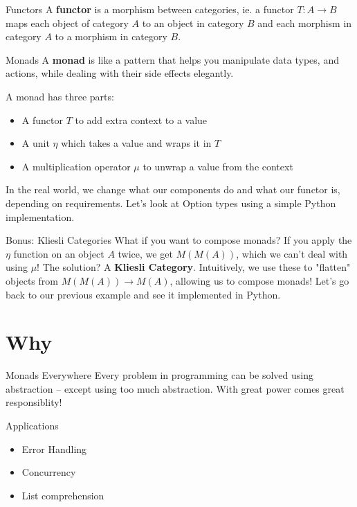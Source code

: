 \documentclass{purdue-slide}
\begin{document}
\begin{frame}{Functors}
    A \textbf{functor} is a morphism between categories, ie. a functor $T: A \rightarrow B$ maps each object of category $A$ to an object in category $B$ and each morphism in category $A$ to a morphism in category $B$. 
\end{frame}

\begin{frame}{Monads}
    A \textbf{monad} is like a pattern that helps you manipulate data types, and actions, while dealing with their side effects elegantly. 

   \par \medskip A monad has three parts: \begin{itemize}
        \item A functor $T$ to add extra context to a value
        \item A unit $\eta$ which takes a value and wraps it in $T$
        \item A multiplication operator $\mu$ to unwrap a value from the context
    \end{itemize}

    \par \medskip In the real world, we change what our components do and what our functor is, depending on requirements. Let's look at Option types using a simple Python implementation.
\end{frame}

\begin{frame}{Bonus: Kliesli Categories}
    What if you want to compose monads? If you apply the $\eta$ function on an object $A$ twice, we get $M(M(A))$, which we can't deal with using $\mu$! The solution? A \textbf{Kliesli Category}. Intuitively, we use these to "flatten" objects from $M(M(A)) \rightarrow M(A)$, allowing us to compose monads! Let's go back to our previous example and see it implemented in Python.
\end{frame}

\section{Why}

\begin{titleframe}{Monads Everywhere}
Every problem in programming can be solved using abstraction -- except using too much abstraction. With great power comes great responsiblity!
\end{titleframe}

\begin{frame}{Applications}
    \begin{itemize}
        \item Error Handling
        \item Concurrency
        \item List comprehension
    \end{itemize}
\end{frame}
\end{document}
